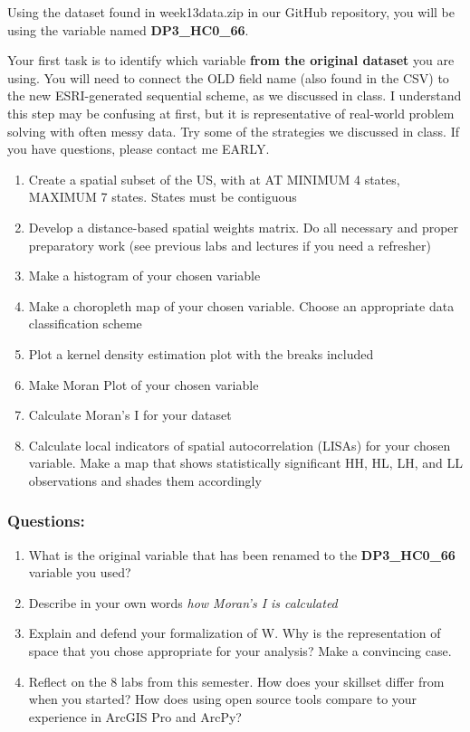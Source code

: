 \documentclass[]{article}
\begin{document}
Using the dataset found in week13data.zip in our GitHub repository, you
will be using the variable named \textbf{DP3\_HC0\_66}.

Your first task is to identify which variable \textbf{from the original
dataset} you are using. You will need to connect the OLD field name
(also found in the CSV) to the new ESRI-generated sequential scheme, as
we discussed in class. I understand this step may be confusing at first,
but it is representative of real-world problem solving with often messy
data. Try some of the strategies we discussed in class. If you have
questions, please contact me EARLY.

\begin{enumerate}
\def\labelenumi{\arabic{enumi}.}
\setcounter{enumi}{1}
\item
  Create a spatial subset of the US, with at AT MINIMUM 4 states,
  MAXIMUM 7 states. States must be contiguous
\item
  Develop a distance-based spatial weights matrix. Do all necessary and
  proper preparatory work (see previous labs and lectures if you need a
  refresher)
\item
  Make a histogram of your chosen variable
\item
  Make a choropleth map of your chosen variable. Choose an appropriate
  data classification scheme
\item
  Plot a kernel density estimation plot with the breaks included
\item
  Make Moran Plot of your chosen variable
\item
  Calculate Moran's I for your dataset
\item
  Calculate local indicators of spatial autocorrelation (LISAs) for your
  chosen variable. Make a map that shows statistically significant HH,
  HL, LH, and LL observations and shades them accordingly
\end{enumerate}

\hypertarget{questions}{%
\subsubsection{Questions:}\label{questions}}

\begin{enumerate}
\def\labelenumi{\arabic{enumi}.}
\item
  What is the original variable that has been renamed to the
  \textbf{DP3\_HC0\_66} variable you used?
\item
  Describe in your own words \emph{how Moran's I is calculated}
\item
  Explain and defend your formalization of W. Why is the representation
  of space that you chose appropriate for your analysis? Make a
  convincing case.
\item
  Reflect on the 8 labs from this semester. How does your skillset
  differ from when you started? How does using open source tools compare
  to your experience in ArcGIS Pro and ArcPy?
\end{enumerate}
\end{document}

